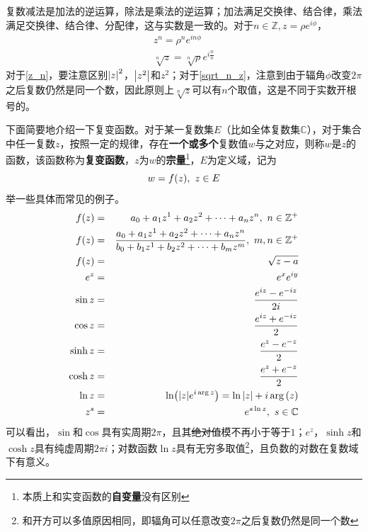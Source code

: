 \documentclass[12pt,a4paper,openany,twoside]{book}
\numberwithin{equation}{section}
\begin{document}
            复数减法是加法的逆运算，除法是乘法的逆运算；加法满足交换律、结合律，乘法满足交换律、结合律、分配律，这与实数是一致的。对于$n\in\mathbb{Z},z=\rho e^{i\phi}$，
            \begin{eqnarray}
              \label{z_n}
              z^n=\rho^ne^{in\phi}\\
              \label{sqrt_n_z}
              \sqrt[n]{z}=\sqrt[n]{\rho}e^{i\frac{\phi}{n}}
            \end{eqnarray}
            对于\ref{z_n}，要注意区别$\abs{z}^2$，$\abs{z^2}$和$z^2$；对于\ref{sqrt_n_z}，注意到由于辐角$\phi$改变$2\pi$之后复数仍然是同一个数，因此原则上$\sqrt[n]{z}$可以有$n$个取值，这是不同于实数开根号的。

            下面简要地介绍一下复变函数。对于某一复数集$E$（比如全体复数集$\mathbb{C}$），对于集合中任一复数$z$，按照一定的规律，存在\textbf{一个或多个}复数值$w$与之对应，则称$w$是$z$的函数，该函数称为\textbf{复变函数}，$z$为$w$的\textbf{宗量}\footnote{本质上和实变函数的\textbf{自变量}没有区别}，$E$为定义域，记为
            \begin{equation}
              w=f\qty(z),\ z\in E
            \end{equation}
            举一些具体而常见的例子。
            \begin{eqnarray*}
              f\qty(z)&=&a_0+a_1z^1+a_2z^2+\cdots+a_nz^n,\ n\in\mathbb{Z}^+\\
              f\qty(z)&=&\frac{a_0+a_1z^1+a_2z^2+\cdots+a_nz^n}{b_0+b_1z^1+b_2z^2+\cdots+b_mz^m},\ m,n\in\mathbb{Z}^+\\
              f\qty(z)&=&\sqrt{z-a}\\
              e^z&=&e^xe^{iy}\\
              \sin z&=&\frac{e^{iz}-e^{-iz}}{2i}\\
              \cos z&=&\frac{e^{iz}+e^{-iz}}{2}\\
              \sinh z&=&\frac{e^z-e^{-z}}{2}\\
              \cosh z&=&\frac{e^z+e^{-z}}{2}\\
              \ln z&=&\ln(\abs{z}e^{i\arg{z}})=\ln\abs{z}+i\arg\qty(z)\\
              z^s&=&e^{s\ln z},\ s\in\mathbb{C}
            \end{eqnarray*}
            可以看出，$\sin$和$\cos$具有实周期$2\pi$，且其\sout{绝对值}模不再小于等于$1$；$e^z$，$\sinh z$和$\cosh z$具有纯虚周期$2\pi i$；对数函数$\ln z$具有无穷多取值\footnote{和开方可以多值原因相同，即辐角可以任意改变$2\pi$之后复数仍然是同一个数}，且负数的对数在复数域下有意义。
\end{document}
